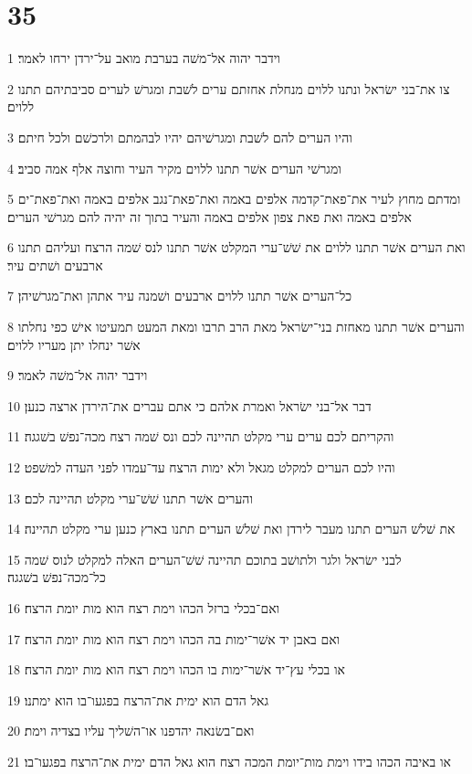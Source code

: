 \chapter{35}

\par 1 וידבר יהוה אל־משׁה בערבת מואב על־ירדן ירחו לאמר׃
\par 2 צו את־בני ישׂראל ונתנו ללוים מנחלת אחזתם ערים לשׁבת ומגרשׁ לערים סביבתיהם תתנו ללוים׃
\par 3 והיו הערים להם לשׁבת ומגרשׁיהם יהיו לבהמתם ולרכשׁם ולכל חיתם׃
\par 4 ומגרשׁי הערים אשׁר תתנו ללוים מקיר העיר וחוצה אלף אמה סביב׃
\par 5 ומדתם מחוץ לעיר את־פאת־קדמה אלפים באמה ואת־פאת־נגב אלפים באמה ואת־פאת־ים אלפים באמה ואת פאת צפון אלפים באמה והעיר בתוך זה יהיה להם מגרשׁי הערים׃
\par 6 ואת הערים אשׁר תתנו ללוים את שׁשׁ־ערי המקלט אשׁר תתנו לנס שׁמה הרצח ועליהם תתנו ארבעים ושׁתים עיר׃
\par 7 כל־הערים אשׁר תתנו ללוים ארבעים ושׁמנה עיר אתהן ואת־מגרשׁיהן׃
\par 8 והערים אשׁר תתנו מאחזת בני־ישׂראל מאת הרב תרבו ומאת המעט תמעיטו אישׁ כפי נחלתו אשׁר ינחלו יתן מעריו ללוים׃
\par 9 וידבר יהוה אל־משׁה לאמר׃
\par 10 דבר אל־בני ישׂראל ואמרת אלהם כי אתם עברים את־הירדן ארצה כנען׃
\par 11 והקריתם לכם ערים ערי מקלט תהיינה לכם ונס שׁמה רצח מכה־נפשׁ בשׁגגה׃
\par 12 והיו לכם הערים למקלט מגאל ולא ימות הרצח עד־עמדו לפני העדה למשׁפט׃
\par 13 והערים אשׁר תתנו שׁשׁ־ערי מקלט תהיינה לכם׃
\par 14 את שׁלשׁ הערים תתנו מעבר לירדן ואת שׁלשׁ הערים תתנו בארץ כנען ערי מקלט תהיינה׃
\par 15 לבני ישׂראל ולגר ולתושׁב בתוכם תהיינה שׁשׁ־הערים האלה למקלט לנוס שׁמה כל־מכה־נפשׁ בשׁגגה׃
\par 16 ואם־בכלי ברזל הכהו וימת רצח הוא מות יומת הרצח׃
\par 17 ואם באבן יד אשׁר־ימות בה הכהו וימת רצח הוא מות יומת הרצח׃
\par 18 או בכלי עץ־יד אשׁר־ימות בו הכהו וימת רצח הוא מות יומת הרצח׃
\par 19 גאל הדם הוא ימית את־הרצח בפגעו־בו הוא ימתנו׃
\par 20 ואם־בשׂנאה יהדפנו או־השׁליך עליו בצדיה וימת׃
\par 21 או באיבה הכהו בידו וימת מות־יומת המכה רצח הוא גאל הדם ימית את־הרצח בפגעו־בו׃
